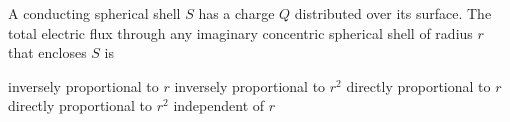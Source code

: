\begin{questions}\setcounter{question}{33}\question
A conducting spherical shell $S$ has a charge $Q$ distributed over its surface. The total electric flux through any imaginary concentric spherical shell of radius $r$ that encloses $S$ is

\begin{choices}
\choice inversely proportional to $r$
\choice inversely proportional to $r^{2}$
\choice directly proportional to $r$
\choice directly proportional to $r^{2}$
\choice independent of $r$
\end{choices}\end{questions}

